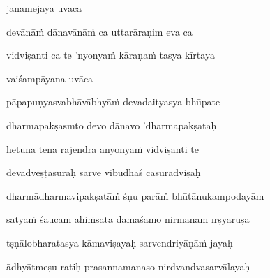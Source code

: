 \jump\jump
\vers

janamejaya uvāca~{\dandab}\dontdisplaylinenum 

devānāṁ dānavānāṁ ca uttarāraṇim eva ca\thinspace{\danda} \dontdisplaylinenum

vidviṣanti ca te 'nyonyaṁ kāraṇaṁ tasya kīrtaya \veg\dontdisplaylinenum
{}

vaiśampāyana uvāca~{\dandab}\dontdisplaylinenum 

pāpapuṇyasvabhāvābhyāṁ devadaityasya bhūpate\thinspace{\danda} \dontdisplaylinenum

dharmapakṣasmto devo dānavo 'dharmapakṣataḥ \veg\dontdisplaylinenum
{}

hetunā tena rājendra anyonyaṁ vidviṣanti te\thinspace{\dandab} \dontdisplaylinenum

devadveṣṭāsurāḥ sarve vibudhāś cāsuradviṣaḥ \veg\dontdisplaylinenum



\ujvers\nemsloka 
dharmādharmavipakṣatāṁ śṇu parāṁ bhūtānukampodayām
\dontdisplaylinenum

\nemslokab 
satyaṁ śaucam ahiṁsatā damaśamo nirmānam īrṣyāruṣā \danda\dontdisplaylinenum

\nemslokac 
tṣṇālobharatasya kāmaviṣayaḥ sarvendriyāṇāṁ jayaḥ
\dontdisplaylinenum

\nemslokad 
ādhyātmeṣu ratiḥ prasannamanaso nirdvandvasarvālayaḥ \veg\dontdisplaylinenum
{}

